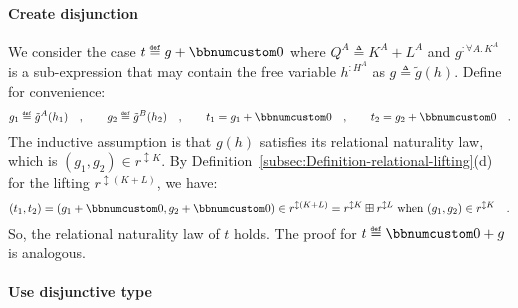 \paragraph{Create disjunction}

We consider the case $t\triangleq g+\bbnum 0$ where $Q^{A}\triangleq K^{A}+L^{A}$
and $g^{:\forall A.\,K^{A}}$ is a sub-expression that may contain
the free variable $h^{:H^{A}}$ as $g\triangleq\tilde{g}(h)$. Define
for convenience: 
\[
g_{1}\triangleq\tilde{g}^{A}(h_{1})\quad,\quad\quad g_{2}\triangleq\tilde{g}^{B}(h_{2})\quad,\quad\quad t_{1}=g_{1}+\bbnum 0\quad,\quad\quad t_{2}=g_{2}+\bbnum 0\quad.
\]
The inductive assumption is that $g(h)$ satisfies its relational
naturality law, which is $(g_{1},g_{2})\in r^{\updownarrow K}$. By
Definition~\ref{subsec:Definition-relational-lifting}(d) for the
lifting $r^{\updownarrow(K+L)}$, we have:
\[
(t_{1},t_{2})=(g_{1}+\bbnum 0,g_{2}+\bbnum 0)\in r^{\updownarrow(K+L)}=r^{\updownarrow K}\boxplus r^{\updownarrow L}\text{ when }(g_{1},g_{2})\in r^{\updownarrow K}\quad.
\]
So, the relational naturality law of $t$ holds. The proof for $t\triangleq\bbnum 0+g$
is analogous.

\paragraph{Use disjunctive type}

